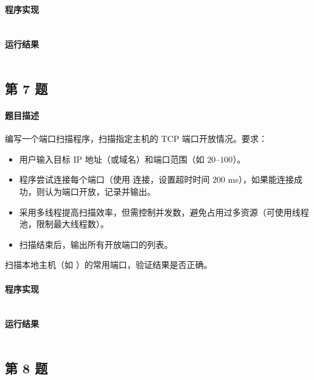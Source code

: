 \documentclass{academics}
\begin{document}
\paragraph{程序实现} {
    \inputminted[label=HttpServer.java]{java}{../src/P06/HttpServer.java}
}

\paragraph{运行结果} {
    \inputminted{text}{../res/P06.out}
}

\subsection{第 7 题}

\paragraph{题目描述} {
    编写一个端口扫描程序，扫描指定主机的 TCP 端口开放情况。要求：
    \begin{itemize}
        \item 用户输入目标 IP 地址（或域名）和端口范围（如 $20$--$100$）。
        \item 程序尝试连接每个端口（使用  连接，设置超时时间 $200$ ms），如果能连接成功，则认为端口开放，记录并输出。
        \item 采用多线程提高扫描效率，但需控制并发数，避免占用过多资源（可使用线程池，限制最大线程数）。
        \item 扫描结束后，输出所有开放端口的列表。
    \end{itemize}
    扫描本地主机（如 ）的常用端口，验证结果是否正确。
}

\paragraph{程序实现} {
    \inputminted[label=PortScanner.java]{java}{../src/P07/PortScanner.java}
}

\paragraph{运行结果} {
    \inputminted{text}{../res/P07.out}
}

\subsection{第 8 题}
\end{document}
